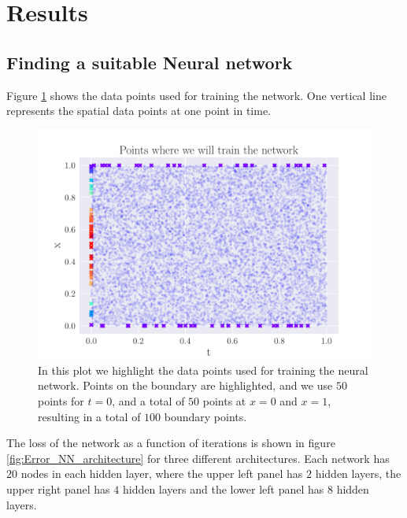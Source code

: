 \documentclass[12pt]{extarticle}
\begin{document}
\section{Results}

\subsection{Finding a suitable Neural network}

Figure \ref{fig:NN_training_points} shows the data points used for training the network. One vertical line represents the spatial data points at one point in time.   
\begin{figure}[h]
	\centering
	\includegraphics[width=\linewidth]{../output/plots/training_points.pdf}
	\caption{In this plot we highlight the data points used for training the neural network. Points on the boundary are highlighted, and we use $50$ points for $t=0$, and a total of $50$ points at $x=0$ and $x=1$, resulting in a total of $100$ boundary points.} \label{fig:NN_training_points}
\end{figure}

The loss of the network as a function of iterations is shown in figure \ref{fig:Error_NN_architecture} for three different architectures. Each network has $20$ nodes in each hidden layer, where the upper left panel has $2$ hidden layers, the upper right panel has $4$ hidden layers and the lower left panel has $8$ hidden layers. 
\end{document}
